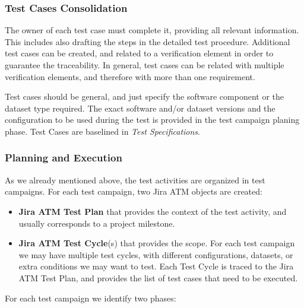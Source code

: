 \subsubsection{Test Cases Consolidation}

The owner of each test case must complete it, providing all relevant information.
This includes also drafting the steps in the detailed test procedure.
Additional test cases can be created, and related to a verification element in order to guarantee the traceability.
In general, test cases can be related with multiple verification elements, and therefore with more than one requirement.

Test cases should be general, and just specify the software component or the dataset type required.
The exact software and/or dataset versions and the configuration to be used during the test
is provided in the test campaign planing phase.
Test Cases are baselined in \textit{Test Specifications}.

\subsubsection{Planning and Execution}

As we already mentioned above, the test activities are organized in test campaigns.
For each test campaign, two Jira ATM objects are created:

\begin{itemize}
\item \textbf{Jira ATM Test Plan} that provides the context of the test activity, and usually corresponds to a project milestone.
\item \textbf{Jira ATM Test Cycle}(s) that provides the scope. For each test campaign we may have multiple test cycles,
with different configurations, datasets, or extra conditions we may want to test. Each Test Cycle is traced
to the Jira ATM Test Plan, and provides the list of test cases that need to be executed.
\end{itemize}

For each test campaign we identify two phases:

